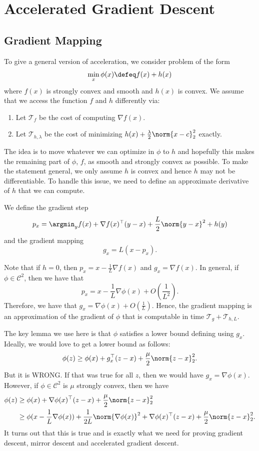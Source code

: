 \section{Accelerated Gradient Descent\label{sec:Accelerated-Gradient-Descent}}


\subsection{Gradient Mapping}

To give a general version of acceleration, we consider problem of
the form
\[
\min_{x}\phi(x)\defeq f(x)+h(x)
\]
where $f(x)$ is strongly convex and smooth and $h(x)$ is convex.
We assume that we access the function $f$ and $h$ differently via:
\begin{enumerate}
\item Let $\mathcal{T}_{f}$ be the cost of computing $\nabla f(x)$.
\item Let $\mathcal{T}_{h,\lambda}$ be the cost of minimizing $h(x)+\frac{\lambda}{2}\norm{x-c}_{2}^{2}$
exactly.
\end{enumerate}
The idea is to move whatever we can optimize in $\phi$ to $h$ and
hopefully this makes the remaining part of $\phi$, $f$, as smooth
and strongly convex as possible. To make the statement general, we
only assume $h$ is convex and hence $h$ may not be differentiable.
To handle this issue, we need to define an approximate derivative
of $h$ that we can compute.
\begin{defn}
We define the gradient step
\[
p_{x}=\argmin_{y}f(x)+\nabla f(x)^{\top}(y-x)+\frac{L}{2}\norm{y-x}^{2}+h(y)
\]
and the gradient mapping
\[
g_{x}=L(x-p_{x}).
\]

Note that if $h=0$, then $p_{x}=x-\frac{1}{L}\nabla f(x)$ and $g_{x}=\nabla f(x)$.
In general, if $\phi\in\mathcal{C}^{2}$, then we have that
\[
p_{x}=x-\frac{1}{L}\nabla\phi(x)+O(\frac{1}{L^{2}}).
\]
Therefore, we have that $g_{x}=\nabla\phi(x)+O(\frac{1}{L})$. Hence,
the gradient mapping is an approximation of the gradient of $\phi$
that is computable in time $\mathcal{T}_{g}+\mathcal{T}_{h,L}$.

The key lemma we use here is that $\phi$ satisfies a lower bound
defining using $g_{x}$. Ideally, we would love to get a lower bound
as follows:
\[
\phi(z)\geq\phi(x)+g_{x}^{\top}(z-x)+\frac{\mu}{2}\norm{z-x}_{2}^{2}.
\]
But it is WRONG. If that was true for all $z$, then we would have
$g_{x}=\nabla\phi(x)$. However, if $\phi\in\mathcal{C}^{2}$ is $\mu$
strongly convex, then we have
\begin{align}
\phi(z) & \geq\phi(x)+\nabla\phi(x)^{\top}(z-x)+\frac{\mu}{2}\norm{z-x}_{2}^{2}\nonumber \\
 & \geq\phi(x-\frac{1}{L}\nabla\phi(x))+\frac{1}{2L}\norm{\nabla\phi(x)}^{2}+\nabla\phi(x)^{\top}(z-x)+\frac{\mu}{2}\norm{z-x}_{2}^{2}.\label{eq:gradient_lower_bound}
\end{align}
It turns out that this is true and is exactly what we need for proving
gradient descent, mirror descent and accelerated gradient descent.
\end{defn}

